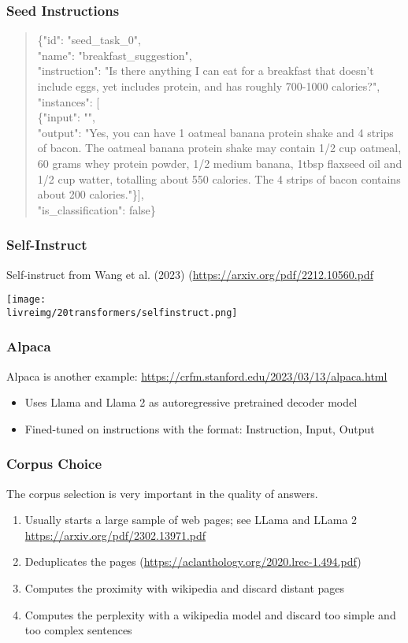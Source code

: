 \begin{frame}[fragile]
\frametitle{Seed Instructions}\color{structure}
\begin{quote}\color{structure}
\{"id": "seed\_task\_0", \\
"name": "breakfast\_suggestion", \\
"instruction": "Is there anything I can eat for a breakfast that doesn't include eggs, yet includes protein, and has roughly 700-1000 calories?", \\
"instances": [\\
\{"input": "", \\
"output": "Yes, you can have 1 oatmeal banana protein shake and 4 strips of bacon. The oatmeal banana protein shake may contain 1/2 cup oatmeal, 60 grams whey protein powder, 1/2 medium banana, 1tbsp flaxseed oil and 1/2 cup watter, totalling about 550 calories. The 4 strips of bacon contains about 200 calories."\}], \\
"is\_classification": false\}
\end{quote}
\end{frame}

\begin{frame}[fragile]
\frametitle{Self-Instruct}\color{structure}
Self-instruct from Wang et al. (2023) (\url{https://arxiv.org/pdf/2212.10560.pdf}
\begin{center}
 \texttt{[image: \\livreimg/20transformers/selfinstruct.png]}
\end{center}
\end{frame}

\begin{frame}[fragile]
\frametitle{Alpaca}\color{structure}
Alpaca is another example: \url{https://crfm.stanford.edu/2023/03/13/alpaca.html}\\
\begin{itemize}\color{structure}
\item Uses Llama and Llama 2 as autoregressive pretrained decoder model
\item Fined-tuned on instructions with the format: Instruction, Input, Output
\end{itemize}
\end{frame}

\begin{frame}[fragile]
\frametitle{Corpus Choice}\color{structure}
The corpus selection is very important in the quality of answers.
\begin{enumerate}\color{structure}
\item Usually starts a large sample of web pages; see LLama and LLama 2 \url{https://arxiv.org/pdf/2302.13971.pdf}
\item Deduplicates the pages (\url{https://aclanthology.org/2020.lrec-1.494.pdf})
\item Computes the proximity with wikipedia and discard distant pages
\item Computes the perplexity with a wikipedia model and discard too simple and too complex sentences
\end{enumerate}
\end{frame}


%


